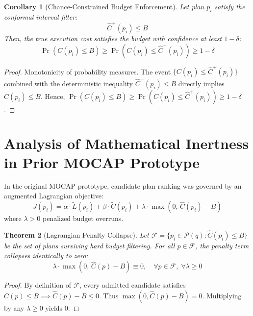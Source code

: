 \documentclass[11pt,a4paper]{article}
\newtheorem{theorem}{Theorem}
\newtheorem{corollary}[theorem]{Corollary}
\begin{document}
\begin{corollary}[Chance-Constrained Budget Enforcement]
Let plan $p_i$ satisfy the conformal interval filter:
\begin{equation}
    \hat{C}^+(p_i) \le B
\end{equation}
Then, the true execution cost satisfies the budget with confidence at least $1 - \delta$:
\begin{equation}
    \Pr\left( C(p_i) \le B \right) \ge \Pr\left( C(p_i) \le \hat{C}^+(p_i) \right) \ge 1 - \delta
\end{equation}
\end{corollary}

\begin{proof}
Monotonicity of probability measures. The event $\{C(p_i) \le \hat{C}^+(p_i)\}$ combined with the deterministic inequality $\hat{C}^+(p_i) \le B$ directly implies $C(p_i) \le B$. Hence, $\Pr(C(p_i) \le B) \ge \Pr(C(p_i) \le \hat{C}^+(p_i)) \ge 1 - \delta$.
\end{proof}

\section{Analysis of Mathematical Inertness in Prior MOCAP Prototype}

In the original MOCAP prototype, candidate plan ranking was governed by an augmented Lagrangian objective:
\begin{equation}
\label{eq:inert_lagrangian}
    J(p_i) = \alpha \cdot \tilde{L}(p_i) + \beta \cdot \tilde{C}(p_i) + \lambda \cdot \max\left( 0, \, \hat{C}(p_i) - B \right)
\end{equation}
where $\lambda > 0$ penalized budget overruns.

\begin{theorem}[Lagrangian Penalty Collapse]
Let $\mathcal{F} = \{p_i \in \mathcal{P}(q) : \hat{C}(p_i) \le B\}$ be the set of plans surviving hard budget filtering. For all $p \in \mathcal{F}$, the penalty term collapses identically to zero:
\begin{equation}
    \lambda \cdot \max\left(0, \, \hat{C}(p) - B\right) \equiv 0, \quad \forall p \in \mathcal{F}, \; \forall \lambda \ge 0
\end{equation}
\end{theorem}
\begin{proof}
By definition of $\mathcal{F}$, every admitted candidate satisfies $\hat{C}(p) \le B \implies \hat{C}(p) - B \le 0$. Thus $\max(0, \hat{C}(p) - B) = 0$. Multiplying by any $\lambda \ge 0$ yields 0.
\end{proof}
\end{document}
